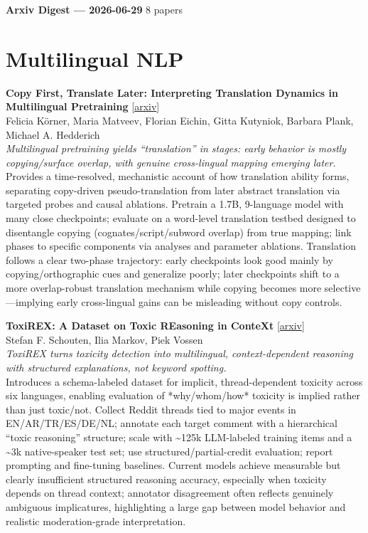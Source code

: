 \documentclass[12pt,letterpaper]{article}
\begin{document}
{\footnotesize\textbf{Arxiv Digest --- 2026-06-29} \hfill 8 papers}

\smallskip

\section*{Multilingual NLP}

{\small\textbf{Copy First, Translate Later: Interpreting Translation Dynamics in Multilingual Pretraining}} {\scriptsize[\href{https://arxiv.org/abs/2604.17633}{arxiv}]}\\
{\scriptsize Felicia K\"orner, Maria Matveev, Florian Eichin, Gitta Kutyniok, Barbara Plank, Michael A. Hedderich}\\

{\small\textit{Multilingual pretraining yields ``translation'' in stages: early behavior is mostly copying/surface overlap, with genuine cross-lingual mapping emerging later.}}\\[1pt]
{\footnotesize Provides a time-resolved, mechanistic account of how translation ability forms, separating copy-driven pseudo-translation from later abstract translation via targeted probes and causal ablations. Pretrain a 1.7B, 9-language model with many close checkpoints; evaluate on a word-level translation testbed designed to disentangle copying (cognates/script/subword overlap) from true mapping; link phases to specific components via analyses and parameter ablations. Translation follows a clear two-phase trajectory: early checkpoints look good mainly by copying/orthographic cues and generalize poorly; later checkpoints shift to a more overlap-robust translation mechanism while copying becomes more selective---implying early cross-lingual gains can be misleading without copy controls.}

\medskip

{\small\textbf{ToxiREX: A Dataset on Toxic REasoning in ConteXt}} {\scriptsize[\href{https://arxiv.org/abs/2606.27981}{arxiv}]}\\
{\scriptsize Stefan F. Schouten, Ilia Markov, Piek Vossen}\\

{\small\textit{ToxiREX turns toxicity detection into multilingual, context-dependent reasoning with structured explanations, not keyword spotting.}}\\[1pt]
{\footnotesize Introduces a schema-labeled dataset for implicit, thread-dependent toxicity across six languages, enabling evaluation of *why/whom/how* toxicity is implied rather than just toxic/not. Collect Reddit threads tied to major events in EN/AR/TR/ES/DE/NL; annotate each target comment with a hierarchical ``toxic reasoning'' structure; scale with \textasciitilde{}125k LLM-labeled training items and a \textasciitilde{}3k native-speaker test set; use structured/partial-credit evaluation; report prompting and fine-tuning baselines. Current models achieve measurable but clearly insufficient structured reasoning accuracy, especially when toxicity depends on thread context; annotator disagreement often reflects genuinely ambiguous implicatures, highlighting a large gap between model behavior and realistic moderation-grade interpretation.}
\end{document}
